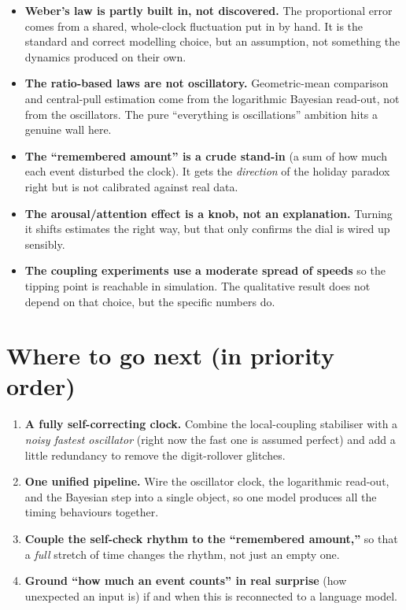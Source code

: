 \documentclass[11pt]{article}
\begin{document}
\begin{itemize}
\item \textbf{Weber's law is partly built in, not discovered.} The proportional error
comes from a shared, whole-clock fluctuation put in by hand. It is the standard and
correct modelling choice, but an assumption, not something the dynamics produced on
their own.
\item \textbf{The ratio-based laws are not oscillatory.} Geometric-mean comparison and
central-pull estimation come from the logarithmic Bayesian read-out, not from the
oscillators. The pure ``everything is oscillations'' ambition hits a genuine wall here.
\item \textbf{The ``remembered amount'' is a crude stand-in} (a sum of how much each
event disturbed the clock). It gets the \emph{direction} of the holiday paradox right
but is not calibrated against real data.
\item \textbf{The arousal/attention effect is a knob, not an explanation.} Turning it
shifts estimates the right way, but that only confirms the dial is wired up sensibly.
\item \textbf{The coupling experiments use a moderate spread of speeds} so the tipping
point is reachable in simulation. The qualitative result does not depend on that
choice, but the specific numbers do.
\end{itemize}

\section{Where to go next (in priority order)}

\begin{enumerate}
\item \textbf{A fully self-correcting clock.} Combine the local-coupling stabiliser
with a \emph{noisy fastest oscillator} (right now the fast one is assumed perfect) and
add a little redundancy to remove the digit-rollover glitches.
\item \textbf{One unified pipeline.} Wire the oscillator clock, the logarithmic
read-out, and the Bayesian step into a single object, so one model produces all the
timing behaviours together.
\item \textbf{Couple the self-check rhythm to the ``remembered amount,''} so that a
\emph{full} stretch of time changes the rhythm, not just an empty one.
\item \textbf{Ground ``how much an event counts'' in real surprise} (how unexpected an
input is) if and when this is reconnected to a language model.
\end{enumerate}
\end{document}

